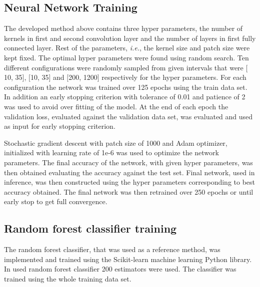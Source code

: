 \documentclass[aps,prb,10pt,twocolumn,groupedaddress]{revtex4-1}
\begin{document}
\subsection{Neural Network Training}
\label{sec:computational_methods_training_neural_network}
The developed method above contains three hyper parameters, the number of kernels in first and second convolution layer and the number of layers in first fully connected layer. Rest of the parameters, \textit{i.e.}, the kernel size and patch size were kept fixed. The optimal hyper parameters were found using random search. Ten different configurations were randomly sampled from given intervals that were $\lbrack$10, 35$\rbrack$, $\lbrack$10, 35$\rbrack$ and $\lbrack$200, 1200$\rbrack$ respectively for the hyper parameters. For each configuration the network was trained over 125 epochs using the train data set. In addition an early stopping criterion with tolerance of 0.01 and patience of 2 was used to avoid over fitting of the model. At the end of each epoch the validation loss, evaluated against the validation data set, was evaluated and used as input for early stopping criterion.

Stochastic gradient descent with patch size of 1000 and Adam optimizer\cite{adam}, initialized with learning rate of 1e-6 was used to optimize the network parameters. The final accuracy of the network, with given hyper parameters, was then obtained evaluating the accuracy against the test set. Final network, used in inference, was then constructed using the hyper parameters corresponding to best accuracy obtained. The final network was then retrained over 250 epochs or until early stop to get full convergence.

\subsection{Random forest classifier training}
\label{sec:computational_methods_training_random_forest}
The random forest classifier, that was used as a reference method, was implemented and trained using the Scikit-learn machine learning Python library. In used random forest classifier 200 estimators were used. The classifier was trained using the whole training data set.
\end{document}
